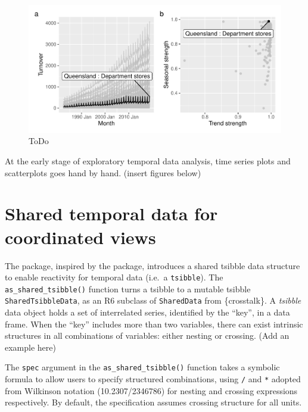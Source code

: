 \begin{Schunk}
\begin{figure}

{\centering \includegraphics[width=\textwidth]{figure/highlight-retail-1} 

}

\caption[ToDo]{ToDo}\label{fig:highlight-retail}
\end{figure}
\end{Schunk}

At the early stage of exploratory temporal data analysis, time series
plots and scatterplots goes hand by hand. (insert figures below)

\hypertarget{shared-temporal-data-for-coordinated-views}{%
\section{Shared temporal data for coordinated
views}\label{shared-temporal-data-for-coordinated-views}}

The  package, inspired by the 
package, introduces a shared tsibble data structure to enable reactivity
for temporal data (i.e.~a \texttt{tsibble}). The
\texttt{as\_shared\_tsibble()} function turns a tsibble to a mutable
tsibble \texttt{SharedTsibbleData}, as an R6 subclass of
\texttt{SharedData} from \{crosstalk\}. A \emph{tsibble} data object
holds a set of interrelated series, identified by the ``key'', in a data
frame. When the ``key'' includes more than two variables, there can
exist intrinsic structures in all combinations of variables: either
nesting or crossing. (Add an example here)

The \texttt{spec} argument in the \texttt{as\_shared\_tsibble()}
function takes a symbolic formula to allow users to specify structured
combinations, using \texttt{/} and \texttt{*} adopted from Wilkinson
notation (10.2307/2346786) for nesting and crossing expressions
respectively. By default, the specification assumes crossing structure
for all units.

